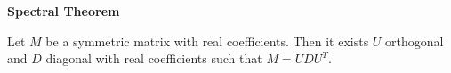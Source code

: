 {\fontsize{12pt}{22pt} \textbf{Spectral Theorem}\par}

\vspace{5mm}

Let $M$ be a symmetric matrix with real coefficients. Then it exists $U$ orthogonal and $D$ diagonal with real coefficients such that $M=UDU^T$.

\vspace{5mm}